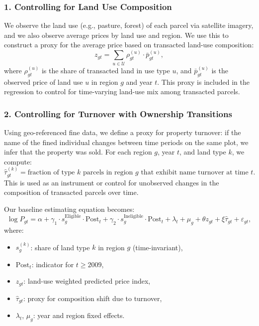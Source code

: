 \documentclass[12pt]{article}
\begin{document}
\subsubsection*{1. Controlling for Land Use Composition}

We observe the land use (e.g., pasture, forest) of each parcel via satellite imagery, and we also observe average prices by land use and region. We use this to construct a proxy for the average price based on transacted land-use composition:
\[
z_{gt} = \sum_{u \in \mathcal{U}} \rho_{gt}^{(u)} \cdot \bar{p}_{gt}^{(u)},
\]
where $\rho_{gt}^{(u)}$ is the share of transacted land in use type $u$, and $\bar{p}_{gt}^{(u)}$ is the observed price of land use $u$ in region $g$ and year $t$. This proxy is included in the regression to control for time-varying land-use mix among transacted parcels.

\subsubsection*{2. Controlling for Turnover with Ownership Transitions}

Using geo-referenced fine data, we define a proxy for property turnover: if the name of the fined individual changes between time periods on the same plot, we infer that the property was sold. For each region $g$, year $t$, and land type $k$, we compute:
\[
\widehat{\tau}_{gt}^{(k)} = \text{fraction of type $k$ parcels in region $g$ that exhibit name turnover at time } t.
\]
This is used as an instrument or control for unobserved changes in the composition of transacted parcels over time.


Our baseline estimating equation becomes:
\[
\log P_{gt} = \alpha + \gamma_1 \cdot s_g^{\text{Eligible}} \cdot \text{Post}_t + \gamma_2 \cdot s_g^{\text{Ineligible}} \cdot \text{Post}_t + \lambda_t + \mu_g + \theta z_{gt} + \xi \widehat{\tau}_{gt} + \varepsilon_{gt},
\]
where:
\begin{itemize}
    \item $s_g^{(k)}$: share of land type $k$ in region $g$ (time-invariant),
    \item $\text{Post}_t$: indicator for $t \geq 2009$,
    \item $z_{gt}$: land-use weighted predicted price index,
    \item $\widehat{\tau}_{gt}$: proxy for composition shift due to turnover,
    \item $\lambda_t$, $\mu_g$: year and region fixed effects.
\end{itemize}
\end{document}
